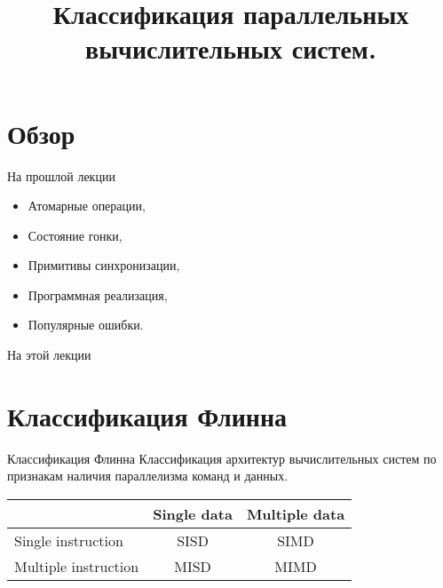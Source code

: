 

\title{Классификация параллельных вычислительных систем.}



\begin{frame}
\titlepage
\end{frame}

\section*{Обзор}

\begin{frame}{На прошлой лекции}
\begin{itemize}
    \item Атомарные операции,
    \item Состояние гонки,
    \item Примитивы синхронизации,
    \item Программная реализация,
    \item Популярные ошибки.
\end{itemize}
\end{frame}

\begin{frame}{На этой лекции}
\tableofcontents
\end{frame}

\section{Классификация Флинна}

\begin{frame}{Классификация Флинна}
Классификация архитектур вычислительных систем по признакам наличия параллелизма
команд и данных.
\begin{table}[htp]
    \begin{center}
    \begin{tabular}{|l|c|c|}
        \hline
                                & Single data   & Multiple data \\
        \hline
        Single instruction      & SISD          & SIMD \\
        \hline
        Multiple instruction    & MISD          & MIMD \\
        \hline
    \end{tabular}
    \end{center}
\end{table}
\end{frame}

